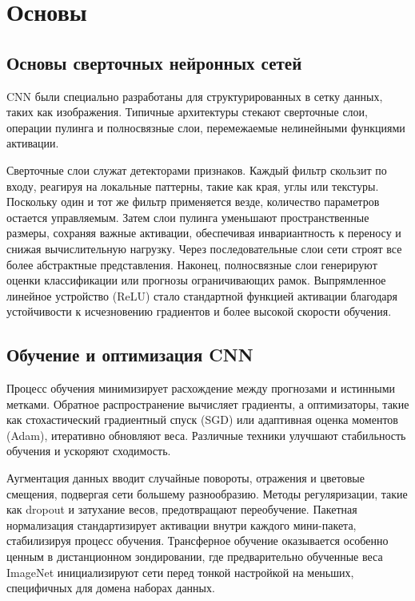\documentclass[12pt,a4paper]{article}
\begin{document}
\section{Основы}
\label{sec:background}
\subsection{Основы сверточных нейронных сетей}
CNN были специально разработаны для структурированных в сетку данных, таких как изображения. Типичные архитектуры стекают сверточные слои, операции пулинга и полносвязные слои, перемежаемые нелинейными функциями активации.

Сверточные слои служат детекторами признаков. Каждый фильтр скользит по входу, реагируя на локальные паттерны, такие как края, углы или текстуры. Поскольку один и тот же фильтр применяется везде, количество параметров остается управляемым. Затем слои пулинга уменьшают пространственные размеры, сохраняя важные активации, обеспечивая инвариантность к переносу и снижая вычислительную нагрузку. Через последовательные слои сети строят все более абстрактные представления. Наконец, полносвязные слои генерируют оценки классификации или прогнозы ограничивающих рамок. Выпрямленное линейное устройство (ReLU) стало стандартной функцией активации благодаря устойчивости к исчезновению градиентов и более высокой скорости обучения.

\subsection{Обучение и оптимизация CNN}
Процесс обучения минимизирует расхождение между прогнозами и истинными метками. Обратное распространение вычисляет градиенты, а оптимизаторы, такие как стохастический градиентный спуск (SGD) или адаптивная оценка моментов (Adam), итеративно обновляют веса. Различные техники улучшают стабильность обучения и ускоряют сходимость.

Аугментация данных вводит случайные повороты, отражения и цветовые смещения, подвергая сети большему разнообразию. Методы регуляризации, такие как dropout и затухание весов, предотвращают переобучение. Пакетная нормализация стандартизирует активации внутри каждого мини-пакета, стабилизируя процесс обучения. Трансферное обучение оказывается особенно ценным в дистанционном зондировании, где предварительно обученные веса ImageNet инициализируют сети перед тонкой настройкой на меньших, специфичных для домена наборах данных.
\end{document}
